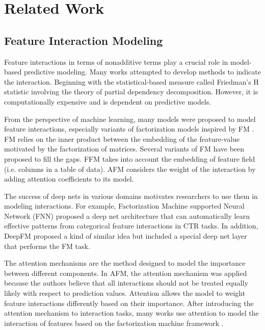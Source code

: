 \section{Related Work}
\label{sec:related}

\subsection{Feature Interaction Modeling}

Feature interactions in terms of nonadditive terms play a crucial role in model-based predictive modeling.
Many works attempted to develop methods to indicate the interaction.
Beginning with the statistical-based measure called Friedman's H statistic \cite{Hstat} involving the theory of partial dependency decomposition.
However, it is computationally expensive and is dependent on predictive models.

From the perspective of machine learning, many models were proposed to model feature interactions, especially variants of factorization models inspired by FM \cite{FM}.
FM relies on the inner product between the embedding of the feature-value motivated by the factorization of matrices.
Several variants of FM have been proposed to fill the gaps.
FFM \cite{FFM} takes into account the embedding of feature field (i.e. columns in a table of data).
AFM \cite{AFM} considers the weight of the interaction by adding attention coefficients to its model.

The success of deep nets in various domains motivates researchers to use them in modeling interactions.
For example, Factorization Machine supported Neural Network (FNN) \cite{FNN} proposed a deep net architecture that can automatically learn effective patterns from categorical feature interactions in CTR tasks.
In addition, DeepFM \cite{DeepFM} proposed a kind of similar idea but included a special deep net layer that performs the FM task.

The attention mechanisms \cite{Bahdanau} are the method designed to model the importance between different components.
In AFM, the attention mechanism was applied because the authors believe that all interactions should not be treated equally likely with respect to prediction values.
Attention allows the model to weight feature interactions differently based on their importance.
After introducing the attention mechanism to interaction tasks, many works use attention to model the interaction of features based on the factorization machine framework \cite{Sarkar2022DualAH, Cheng2019AdaptiveFN,Wang2020AdnFMAA,Wen2020NeuralAM,Li2021GraphFMGF}.

